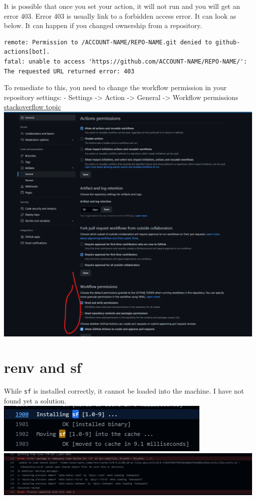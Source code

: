 \documentclass[
]{book}
\begin{document}
It is possible that once you set your action, it will not run and you will get an error 403. Error
403 is usually link to a forbidden access error. It can look as below. It can happen if you changed ownership from a repository.

\begin{verbatim}
remote: Permission to /ACCOUNT-NAME/REPO-NAME.git denied to github-actions[bot].
fatal: unable to access 'https://github.com/ACCOUNT-NAME/REPO-NAME/': The requested URL returned error: 403
\end{verbatim}

To remediate to this, you need to change the workflow permission in your repository settings:
- Settings -\textgreater{} Action -\textgreater{} General -\textgreater{} Workflow permissions \href{https://stackoverflow.com/questions/73687176/permission-denied-to-github-actionsbot-the-requested-url-returned-error-403}{stackoverflow topic}
\includegraphics{images/styler/workflow permissions.png}

\hypertarget{renv-and-sf}{%
\section{renv and sf}\label{renv-and-sf}}

While \texttt{sf} is installed correctly, it cannot be loaded into the machine. I have not found yet a solution.
\includegraphics{images/other/renv and sf/installation.png}
\includegraphics{images/other/renv and sf/error.png}

  
\end{document}
